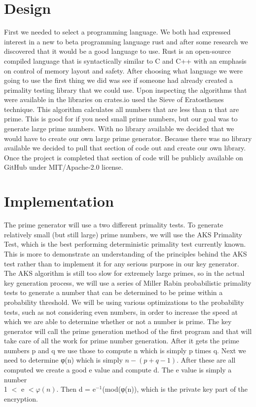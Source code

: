 \documentclass[12pt,journal,compsoc]{IEEEtran}
\begin{document}
\section{Design}
First we needed to select a programming language. We both had expressed interest in a new to beta programming language rust and after some research we discovered that it would be a good language to use. Rust is an open-source compiled language that is syntactically similar to C and C++ with an emphasis on control of memory layout and safety.  
\newline
\indent After choosing what language we were going to use the first thing we did was see if someone had already created a primality testing library that we could use. Upon inspecting the algorithms that were available in the libraries on crates.io used the Sieve of Eratosthenes technique. This algorithm calculates all numbers that are less than n that are prime. This is good for if you need small prime numbers, but our goal was to generate large prime numbers. \newline \indent
With no library available we decided that we would have to create our own large prime generator. Because there was no library available we decided to pull that section of code out and create our own library. Once the project is completed that section of code will be publicly available on GitHub under MIT/Apache-2.0 license.


\section{Implementation}
The prime generator will use a two different primality tests. To generate relatively small (but still large) prime numbers, we will use the AKS Primality Test, which is the best performing deterministic primality test currently known. This is more to demonstrate an understanding of the principles behind the AKS test rather than to implement it for any serious purpose in our key generator. The AKS algorithm is still too slow for extremely large primes, so in the actual key generation process, we will use a series of Miller Rabin probabilistic primality tests to generate a number that can be determined to be prime within a probability threshold. We will be using various optimizations to the probability tests, such as not considering even numbers, in order to increase the speed at which we are able to determine whether or not a number is prime.  
\newline \indent The key generator will call the prime generation method of the first program and that will take care of all the work for prime number generation. After it gets the prime numbers p and q we use those to compute n which is simply p times q. Next we need to determine φ(n) which is simply $n - (p + q -1)$. After these are all computed we create a good e value and compute d. The e value is simply a number \\1 $<$ e $<φ(n)$. Then d = e$^{-1}$(mod(φ(n)), which is the private key part of the encryption.
\end{document}
